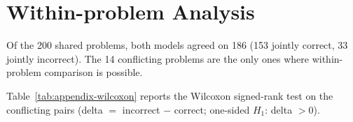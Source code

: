\documentclass[letterpaper]{article}
\begin{document}
\section{Within-problem Analysis}
\label{app:within}

Of the 200 shared problems, both models agreed on 186 (153 jointly
correct, 33 jointly incorrect). The 14 conflicting problems are the
only ones where within-problem comparison is possible.

\begin{table}[t]
\centering
\small
{}
\caption{Model concordance on the 200 shared problems.}
\label{tab:appendix-concordance}
\end{table}

Table~\ref{tab:appendix-wilcoxon} reports the Wilcoxon signed-rank
test on the conflicting pairs (delta $=$ incorrect $-$ correct;
one-sided $H_1$: delta $> 0$).

\begin{table}[t]
\centering
\small
{}
\caption{Wilcoxon signed-rank test on 14 discordant pairs.}
\label{tab:appendix-wilcoxon}
\end{table}
\end{document}
